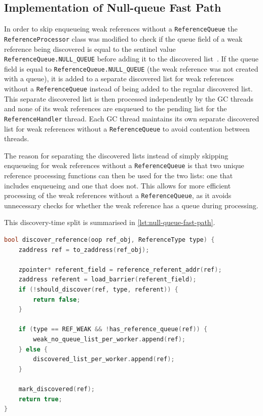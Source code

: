\subsection{Implementation of Null-queue Fast Path}
In order to skip enqueueing weak references without a \texttt{ReferenceQueue} the \texttt{ReferenceProcessor} class was modified to check if the queue field of a weak reference being discovered is equal to the sentinel value \texttt{ReferenceQueue.NULL\_QUEUE} before adding it to the discovered list~\cite{openjdk-reference-java,openjdk-zreferenceprocessor-cpp}. If the queue field is equal to \texttt{ReferenceQueue.NULL\_QUEUE} (the weak reference was not created with a queue), it is added to a separate discovered list for weak references without a \texttt{ReferenceQueue} instead of being added to the regular discovered list. This separate discovered list is then processed independently by the GC threads and none of its weak references are enqueued to the pending list for the \texttt{ReferenceHandler} thread. Each GC thread maintains its own separate discovered list for weak references without a \texttt{ReferenceQueue} to avoid contention between threads.

The reason for separating the discovered lists instead of simply skipping enqueueing for weak references without a \texttt{ReferenceQueue} is that two unique reference processing functions can then be used for the two lists: one that includes enqueueing and one that does not. This allows for more efficient processing of the weak references without a \texttt{ReferenceQueue}, as it avoids unnecessary checks for whether the weak reference has a queue during processing.

This discovery-time split is summarised in \cref{lst:null-queue-fast-path}.

\begin{listing}[t]
\begin{lstlisting}[language=C++]
bool discover_reference(oop ref_obj, ReferenceType type) {
    zaddress ref = to_zaddress(ref_obj);

    zpointer* referent_field = reference_referent_addr(ref);
    zaddress referent = load_barrier(referent_field);
    if (!should_discover(ref, type, referent)) {
        return false;
    }

    if (type == REF_WEAK && !has_reference_queue(ref)) {
        weak_no_queue_list_per_worker.append(ref);
    } else {
        discovered_list_per_worker.append(ref);
    }

    mark_discovered(ref);
    return true;
}
\end{lstlisting}
\caption[Queue-less weak discovery split]{Pseudocode of the null-queue fast path during discovery. Queue-less weak references are routed to a separate discovered list and processed by a no-enqueue pipeline. The corresponding implementation excerpts are provided in \cref{app:refproc-impl-source}.}
\label{lst:null-queue-fast-path}
\end{listing}

